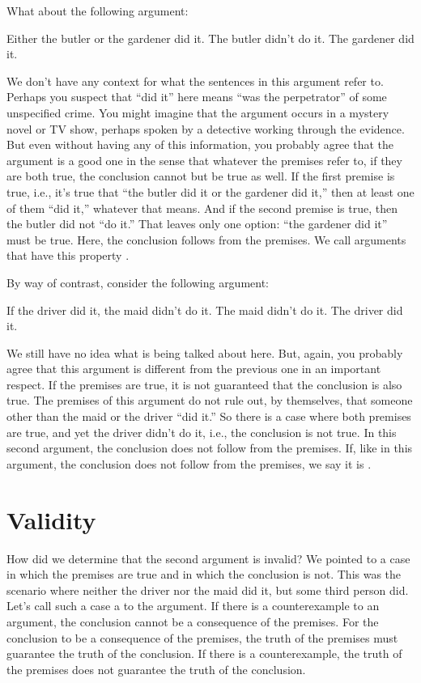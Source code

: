 What about the following argument: 
\begin{earg}
	\prem Either the butler or the gardener did it.
	\prem The butler didn't do it.
	\conc The gardener did it.
\end{earg}
We don't have any context for what the sentences in this argument refer to. Perhaps you suspect that ``did it'' here means ``was the perpetrator'' of some unspecified crime. You might imagine that the argument occurs in a mystery novel or TV show, perhaps spoken by a detective working through the evidence. But even without having any of this information, you probably agree that the argument is a good one in the sense that whatever the premises refer to, if they are both true, the conclusion cannot but be true as well. If the first premise is true, i.e., it's true that ``the butler did it or the gardener did it,'' then at least one of them ``did it,'' whatever that means. And if the second premise is true, then the butler did not ``do it.'' That leaves only one option: ``the gardener did it'' must be true. Here, the conclusion follows from the premises. We call arguments that have this property .

By way of contrast, consider the following argument:
\begin{earg}\label{argMaidDriver}
	\prem If the driver did it, the maid didn't do it.
	\prem The maid didn't do it.
	\conc The driver did it.
\end{earg}
We still have no idea what is being talked about here. But, again, you probably agree that this argument is different from the previous one in an important respect. If the premises are true, it is not guaranteed that the conclusion is also true. The premises of this argument do not rule out, by themselves, that someone other than the maid or the driver ``did it.'' So there is a case where both premises are true, and yet the driver didn't do it, i.e., the conclusion is not true. In this second argument, the conclusion does not follow from the premises. If, like in this argument, the conclusion does not follow from the premises, we say it is .


\section{Validity}
How did we determine that the second argument is invalid? We pointed to a case in which the premises are true and in which the conclusion is not.  This was the scenario where neither the driver nor the maid did it, but some third person did.  Let's call such a case a  to the argument. If there is a counterexample to an argument, the conclusion cannot be a consequence of the premises. For the conclusion to be a consequence of the premises, the truth of the premises must guarantee the truth of the conclusion. If there is a counterexample, the truth of the premises does not guarantee the truth of the conclusion.

